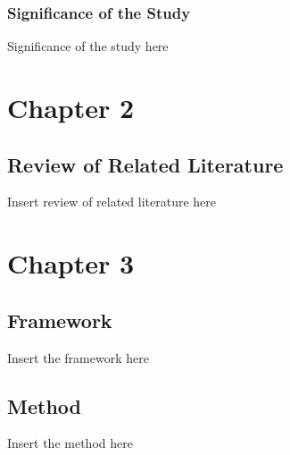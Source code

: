 \documentclass[letterpaper,10pt,titlepage]{article}
\begin{document}
\subsubsection*{Significance of the Study}
Significance of the study here



\section*{Chapter 2}
\subsection*{Review of Related Literature}
Insert review of related literature here


\section*{Chapter 3}


\subsection*{Framework}
Insert the framework here


\subsection*{Method}
Insert the method here
\end{document}
